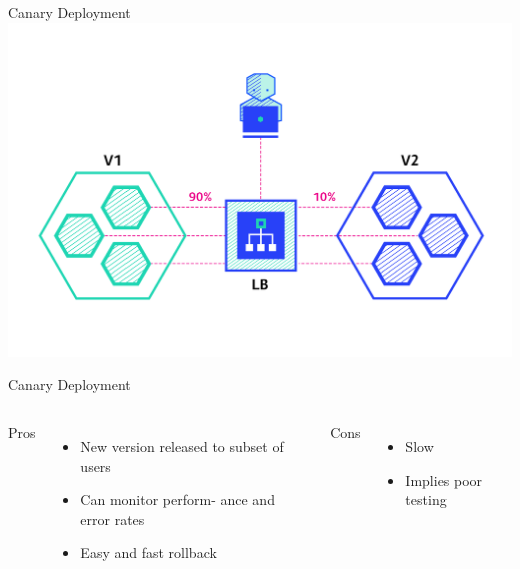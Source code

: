 \documentclass{slide}
\begin{document}
\begin{frame}{Canary Deployment \cite{deployment-strategies}}
    \vspace{1pt}
    \centering
    \includegraphics[height=\textheight]{diagrams/canary/fnum14.png}
\end{frame}

\begin{frame}{Canary Deployment}
    \vspace{1pt}
    \begin{columns}[t]
      \huge Pros
      {\LARGE
        \begin{itemize}
            \item { New version released to subset of users\\}
            \item { Can monitor perform- ance and error rates\\}
            \item Easy and fast rollback
        \end{itemize}
      }
      \huge Cons
      {\LARGE
        \begin{itemize}
            \item Slow
            \item Implies poor testing
        \end{itemize}
      }
    \end{columns}
\end{frame}
\end{document}

